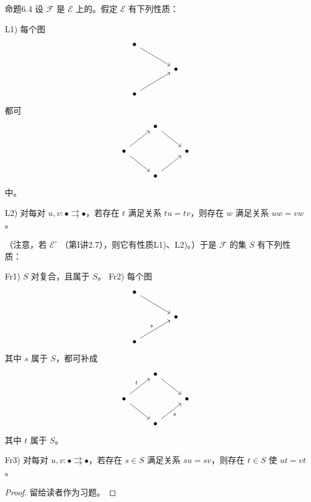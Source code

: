 \begin{SGAresult}{命题}{6.4}
设 $\mathscr F$ 是 $\mathscr E$ 上的。假定 $\mathscr E$ 有下列性质：

L1) 每个图
\[
\begin{tikzcd}[column sep=large]
\bullet\arrow[dr]&\\
&\bullet\\
\bullet\arrow[ur]&
\end{tikzcd}
\]
都可
\[
\begin{tikzcd}
&\bullet\arrow[dr]&\\
\bullet\arrow[ur]\arrow[dr]&&\bullet\\
&\bullet\arrow[ur]&
\end{tikzcd}
\]
中。

L2) 对每对 $u,v:\bullet\rightrightarrows\bullet$，若存在 $t$ 满足关系 $tu=tv$，则存在 $w$ 满足关系 $uw=vw$。

（注意，若 $\mathscr E^{\circ}$ （第I讲2.7），则它有性质L1)、L2)。）于是 $\mathscr F$ 的集 $S$ 有下列性质：

Fr1)  $S$ 对复合，且属于 $S$。
Fr2) 每个图
\[
\begin{tikzcd}[column sep=large]
\bullet\arrow[dr]&\\
&\bullet\\
\bullet\arrow[ur,"s"]&
\end{tikzcd}
\]
其中 $s$ 属于 $S$，都可补成
\[
\begin{tikzcd}
&\bullet\arrow[dr]&\\
\bullet\arrow[ur,"t"]\arrow[dr]&&\bullet\\
&\bullet\arrow[ur,"s"']&
\end{tikzcd}
\]
其中 $t$ 属于 $S$。

Fr3) 对每对 $u,v:\bullet\rightrightarrows\bullet$，若存在 $s\in S$ 满足关系 $su=sv$，则存在 $t\in S$ 使 $ut=vt$。
\end{SGAresult}
\begin{proof}
留给读者作为习题。
\end{proof}

